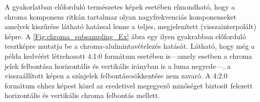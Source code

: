 \vspace{3mm}
A gyakorlatban előforduló természetes képek esetében elmondható, hogy a chroma komponens ritkán tartalmaz olyan nagyfrekvenciás komponenseket amelyek kiszűrése látható hatással lenne a teljes, megjelenített (visszainterpolált) képre.
A \ref{Fig:chroma_subsampling_Ex} ábra egy ilyen gyakrabban előforduló tesztképre mutatja be a chroma-alulmintavételezés hatását.
Látható, hogy még a példa kedvéért létrehozott 4:1:0 formátum esetében is---amely esetben a chroma jelek felbontása horizontális és vertikális irányban is a luma negyede---, a visszaállított képen a színjelek felbontáscsökkentése nem zavaró.
A 4:2:0 formátum ehhez képest közel az eredetivel megegyező minőséget biztosít felezett horizontális és vertikális chroma felbontás mellett.